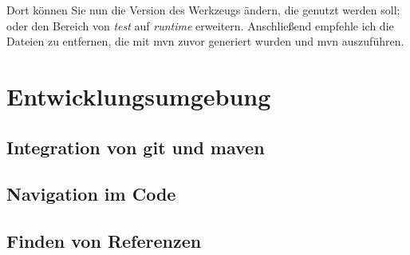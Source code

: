 Dort können Sie nun die Version des Werkzeugs ändern, die genutzt werden soll; oder den Bereich von \emph{test} auf \emph{runtime} erweitern. Anschließend empfehle ich die Dateien zu entfernen, die mit \gls{mvn} zuvor generiert wurden und \gls{mvn} auszuführen.

\section{Entwicklungsumgebung}
\subsection{Integration von git und maven}
\subsection{Navigation im Code}
\subsection{Finden von Referenzen}